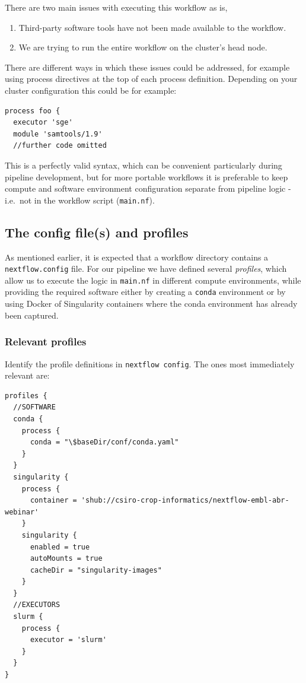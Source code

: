 There are two main issues with executing this workflow as is, 
\begin{enumerate}
 \item Third-party software tools have not been made available to the workflow.
 \item We are trying to run the entire workflow on the cluster's head node.
\end{enumerate}

There are different ways in which these issues could be addressed, for example using process 
directives at the top of each process definition. 
Depending on your cluster configuration this could be for example:
\begin{lstlisting}
process foo {
  executor 'sge' 
  module 'samtools/1.9' 
  //further code omitted 
\end{lstlisting}

This is a perfectly valid syntax, which can be convenient particularly during pipeline development, but for more portable workflows it is preferable to keep compute and software environment configuration separate from pipeline logic - i.e.\ not in the workflow script (\texttt{main.nf}).

\subsection{The config file(s) and profiles}

As mentioned earlier, it is expected that a workflow directory contains a \texttt{nextflow.config} file. 
For our pipeline we have defined several \emph{profiles}, which allow us to execute the logic in \texttt{main.nf} in different compute environments, while providing the required software either by creating a \texttt{conda} environment or by using Docker of Singularity containers where the conda environment has already been captured. 

\subsubsection{Relevant profiles}

\begin{steps}
Identify the profile definitions in \texttt{nextflow config}. The ones most immediately relevant are:
\begin{lstlisting}
profiles {
  //SOFTWARE
  conda {
    process {
      conda = "\$baseDir/conf/conda.yaml"
    }
  }
  singularity {
    process {
      container = 'shub://csiro-crop-informatics/nextflow-embl-abr-webinar' 
    }
    singularity {
      enabled = true
      autoMounts = true
      cacheDir = "singularity-images"  
    }
  }
  //EXECUTORS
  slurm {
    process {
      executor = 'slurm'
    }
  }
}
\end{lstlisting}
\end{steps}

